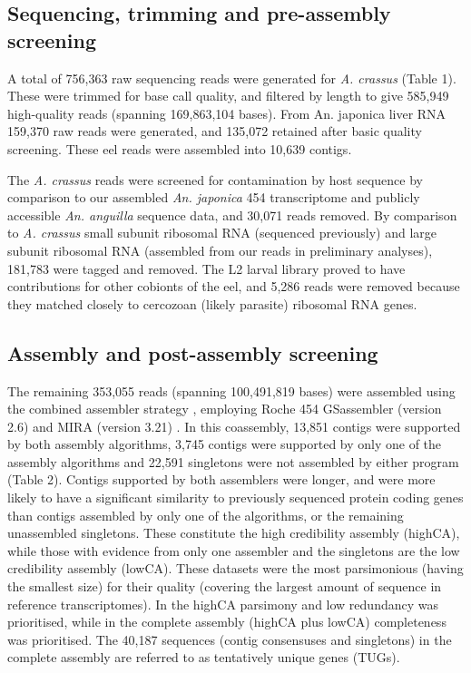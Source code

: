 \documentclass[10pt]{bmc_article}
\newenvironment{bmcformat}{\begin{raggedright}\baselineskip20pt\sloppy\setboolean{publ}{false}}{\end{raggedright}\baselineskip20pt\sloppy}
\begin{document}
\begin{bmcformat}
 \subsection*{Sequencing, trimming and pre-assembly screening}







A total of 756,363 raw sequencing reads
were generated for \textit{A. crassus} (Table 1). These were trimmed
for base call quality, and filtered by length to give
585,949 high-quality reads (spanning
169,863,104 bases). From An. japonica liver RNA
159,370 raw reads were generated, and
135,072 retained after basic quality
screening. These eel reads were assembled into
10,639 contigs.

The \textit{A. crassus} reads were screened for contamination by host
sequence by comparison to our assembled \textit{An. japonica} 454
transcriptome and publicly accessible \textit{An. anguilla} sequence
data, and 30,071 reads removed. By
comparison to \textit{A. crassus} small subunit ribosomal RNA
(sequenced previously) and large subunit ribosomal RNA (assembled from
our reads in preliminary analyses),
181,783 were tagged and removed. The
L2 larval library proved to have contributions for other cobionts of
the eel, and 5,286 reads were
removed because they matched closely to cercozoan (likely parasite)
ribosomal RNA genes.

\subsection*{Assembly and post-assembly screening}


The remaining 353,055 reads (spanning
100,491,819 bases) were assembled using the combined assembler
strategy \cite{pmid20950480}, employing Roche 454 GSassembler (version
2.6) and MIRA (version 3.21) \cite{miraEST}. In this coassembly,
13,851 contigs were supported by both assembly algorithms,
3,745 contigs were supported by only one of the assembly
algorithms and 22,591 singletons were not assembled by
either program (Table 2). Contigs supported by both assemblers were
longer, and were more likely to have a significant similarity to
previously sequenced protein coding genes than contigs assembled by
only one of the algorithms, or the remaining unassembled
singletons. These constitute the high credibility assembly (highCA),
while those with evidence from only one assembler and the singletons
are the low credibility assembly (lowCA). These datasets were the most
parsimonious (having the smallest size) for their quality (covering
the largest amount of sequence in reference transcriptomes). In the
highCA parsimony and low redundancy was prioritised, while in the
complete assembly (highCA plus lowCA) completeness was
prioritised. The 40,187 sequences (contig consensuses and singletons)
in the complete assembly are referred to as tentatively unique genes
(TUGs).





\end{bmcformat}
\end{document}
